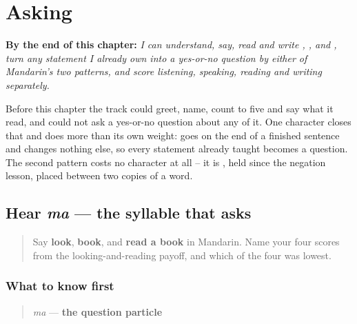 
\chapter{Asking}
\label{ch:zh-asking}

\begin{chapteropening}
\textbf{By the end of this chapter:} \emph{I can understand, say, read and write , ,  and , turn any statement I already own into a yes-or-no question by either of Mandarin's two patterns, and score listening, speaking, reading and writing separately.}

Before this chapter the track could greet, name, count to five and say what it read, and could not ask a yes-or-no question about any of it. One character closes that and does more than its own weight:  goes on the end of a finished sentence and changes nothing else, so every statement already taught becomes a question. The second pattern costs no character at all -- it is , held since the negation lesson, placed between two copies of a word.
\end{chapteropening}

\section[ma]{Hear \emph{ma} — the syllable that asks}

\label{lesson:ZH-C19-hear-ma}



\begin{quote}
Say \textbf{look}, \textbf{book}, and \textbf{read a book} in Mandarin. Name your four scores from the looking-and-reading payoff, and which of the four was lowest.
\end{quote}

\subsection*{What to know first}
\begin{quote}
\emph{ma} — \textbf{the question particle}
\end{quote}

